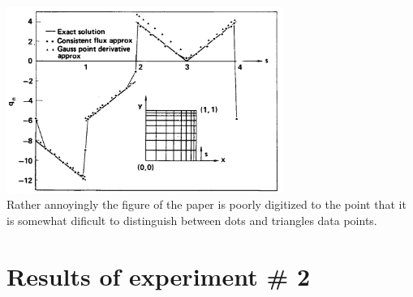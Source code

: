 \begin{center}
\includegraphics[width=9cm]{python_codes/fieldstone_173/images/grls87a}\\
{\captionfont Rather annoyingly the figure of the paper is poorly digitized 
to the point that it is somewhat dificult to distinguish between dots and triangles data points.}
\end{center}




\newpage
\section*{Results of experiment \# 2}

